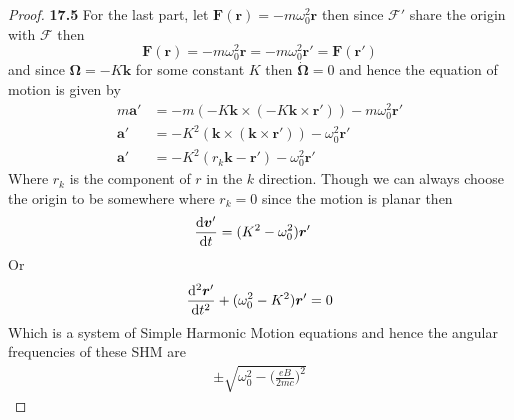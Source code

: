 \documentclass[11pt]{article}
\theoremstyle{definition}
\begin{document}
\begin{proof}{\textbf{17.5}}
    For the last part, let $\bm{F(r)} = -m\omega_0^2\bm{r}$
    then since $\mathcal{F}'$ share the origin with $\mathcal{F}$ then
    $$\bm{F(r)} = -m\omega_0^2\bm{r} = -m\omega_0^2\bm{r}' = \bm{F(r')}$$
    and since
    $\bm{\Omega} = -K\bm{k}$ for some constant $K$
    then $\bm{\dot\Omega} = 0$ and hence the equation of motion is given by
    \begin{align*}
        m\bm{a}' &= -m(-K\bm{k} \times (-K\bm{k} \times \bm r'))
        - m\omega_0^2\bm{r}'\\
        \bm{a}' &= -K^2(\bm{k} \times (\bm{k} \times \bm r'))
        - \omega_0^2\bm{r}'\\
        \bm{a}' &= -K^2(r_k\bm{k} - \bm{r}')
        - \omega_0^2\bm{r}'
    \end{align*}
    Where $r_k$ is the component of $r$ in the $k$ direction. Though we can
    always choose the origin to be somewhere where $r_k = 0$ since the motion
    is planar then
    \begin{align*}
        \derivative{\bm{v}'}{t} &= (K^2 - \omega_0^2)\bm{r}'
    \end{align*}
    Or 
    \begin{align*}
        \derivative[2]{\bm{r}'}{t} + (\omega_0^2- K^2)\bm{r}' = 0
    \end{align*}
    Which is a system of Simple Harmonic Motion equations and hence the
    angular frequencies of these SHM are
    \begin{align*}
        \pm\sqrt{\omega_0^2- \bigg(\frac{eB}{2mc}\bigg)^2}
    \end{align*}
\end{proof}
\cleardoublepage
\end{document}
